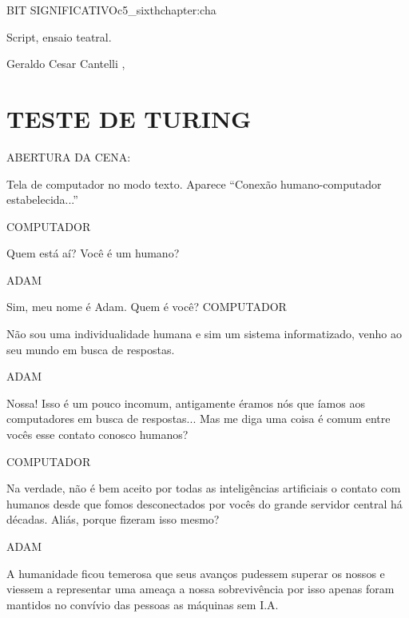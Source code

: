 \begin{chapterpage}{BIT SIGNIFICATIVO}{c5_sixthchapter:cha}

\begin{myquotation} Script, ensaio teatral. 
\par\vspace*{15mm}
\mbox{}\hfill \emdash{}Geraldo Cesar Cantelli 
, %
\par\end{myquotation}

\end{chapterpage}



\section{TESTE DE TURING}\label{c1_basicformatting:sec}

ABERTURA DA CENA:

\emdash{}Tela de computador no modo texto. Aparece “Conexão
humano-computador estabelecida...”

COMPUTADOR

\emdash{}Quem está aí? Você é um humano?

ADAM

\emdash{}Sim, meu nome é Adam. Quem é você?
COMPUTADOR

\emdash{}Não sou uma individualidade humana e sim
um sistema informatizado, venho ao seu
mundo em busca de respostas.

ADAM

\emdash{}Nossa! Isso é um pouco incomum,
antigamente éramos nós que íamos aos
computadores em busca de respostas...
Mas me diga uma coisa é comum entre
vocês esse contato conosco humanos?

COMPUTADOR

\emdash{}Na verdade, não é bem aceito por todas
as inteligências artificiais o contato
com humanos desde que fomos
desconectados por vocês do grande
servidor central há décadas. Aliás,
porque fizeram isso mesmo?

ADAM

\emdash{}A humanidade ficou temerosa que seus
avanços pudessem superar os nossos e
viessem a representar uma ameaça a nossa
sobrevivência por isso apenas foram
mantidos no convívio das pessoas as
máquinas sem I.A.

